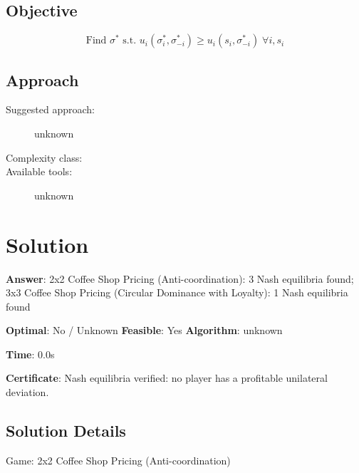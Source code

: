 \documentclass[11pt, a4paper]{article}
\begin{document}
\subsection{Objective}

\begin{equation}
\text{Find } \sigma^* \text{ s.t. } u_i(\sigma_i^*, \sigma_{-i}^*) \ge u_i(s_i, \sigma_{-i}^*) \; \forall i, s_i
\end{equation}

\subsection{Approach}

\begin{description}
  \item[Suggested approach:] unknown
  \item[Complexity class:] 
  \item[Available tools:] unknown
\end{description}
\section{Solution}

\begin{polyaresult}

\textbf{Answer}: 2x2 Coffee Shop Pricing (Anti-coordination): 3 Nash equilibria found; 3x3 Coffee Shop Pricing (Circular Dominance with Loyalty): 1 Nash equilibria found


\textbf{Optimal}: No / Unknown \hfill
\textbf{Feasible}: Yes
\textbf{Algorithm}: unknown \quad $$

\textbf{Time}: 0.0s

\textbf{Certificate}: Nash equilibria verified: no player has a profitable unilateral deviation.

\end{polyaresult}

\subsection{Solution Details}

Game: 2x2 Coffee Shop Pricing (Anti-coordination)
\end{document}
